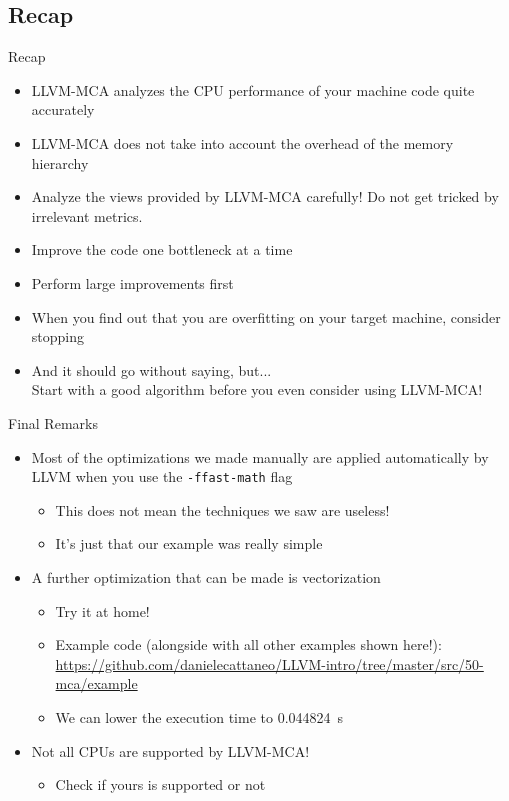 
\subsection{Recap}


\begin{frame}{Recap}
\begin{itemize}
\item LLVM-MCA analyzes the CPU performance of your machine code quite accurately
\item \alert{LLVM-MCA does not take into account the overhead of the memory hierarchy}
\item Analyze the views provided by LLVM-MCA carefully! Do not get tricked by irrelevant metrics.
\item Improve the code one bottleneck at a time
\item Perform large improvements first
\item When you find out that you are overfitting on your target machine, consider stopping
\medskip
\item {\footnotesize And it should go without saying, but...}\\
	{\normalsize\alert{Start with a good algorithm before you even consider using LLVM-MCA!}}
\end{itemize}
\end{frame}


\begin{frame}{Final Remarks}
\begin{itemize}
\item Most of the optimizations we made manually are applied automatically 
by LLVM when you use the \texttt{-ffast-math} flag
	\begin{itemize}
	\item This does not mean the techniques we saw are useless!
	\item It's just that our example was really simple
	\end{itemize}
\medskip
\item A further optimization that can be made is \alert{vectorization}
	\begin{itemize}
	\item Try it at home!
	\item Example code (alongside with all other examples shown here!):\\
				\url{https://github.com/danielecattaneo/LLVM-intro/tree/master/src/50-mca/example}
	\item We can lower the execution time to \SI{0.044824}{\second}
	\end{itemize}
\medskip
\item Not all CPUs are supported by LLVM-MCA!
	\begin{itemize}
	\item Check if yours is supported or not
	\end{itemize}
\end{itemize}
\end{frame}


